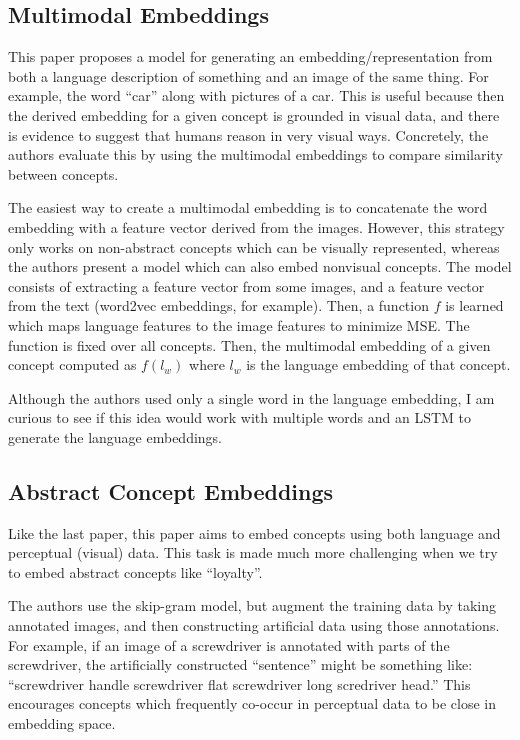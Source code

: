 \documentclass[12pt]{article}
\begin{document}
\subsection{Multimodal Embeddings \cite{MultimodalEmbeddings}}

This paper proposes a model for generating an embedding/representation from both a language description of something and an image of the same thing. For example, the word “car” along with pictures of a car. This is useful because then the derived embedding for a given concept is grounded in visual data, and there is evidence to suggest that humans reason in very visual ways. Concretely, the authors evaluate this by using the multimodal embeddings to compare similarity between concepts. 

The easiest way to create a multimodal embedding is to concatenate the word embedding with a feature vector derived from the images. However, this strategy only works on non-abstract concepts which can be visually represented, whereas the authors present a model which can also embed nonvisual concepts. The model consists of extracting a feature vector from some images, and a feature vector from the text (word2vec embeddings, for example). Then, a function $f$ is learned which maps language features to the image features to minimize MSE. The function is fixed over all concepts. Then, the multimodal embedding of a given concept computed as $f(l_w)$ where $l_w$ is the language embedding of that concept.

Although the authors used only a single word in the language embedding, I am curious to see if this idea would work with multiple words and an LSTM to generate the language embeddings.

\subsection{Abstract Concept Embeddings \cite{AbstractConceptEmbeddings}}

Like the last paper, this paper aims to embed concepts using both language and perceptual (visual) data. This task is made much more challenging when we try to embed abstract concepts like ``loyalty''. 

The authors use the skip-gram model, but augment the training data by taking annotated images, and then constructing artificial data using those annotations. For example, if an image of a screwdriver is annotated with parts of the screwdriver, the artificially constructed ``sentence'' might be something like: ``screwdriver handle screwdriver flat screwdriver long scredriver head.'' This encourages concepts which frequently co-occur in perceptual data to be close in embedding space.
\end{document}
